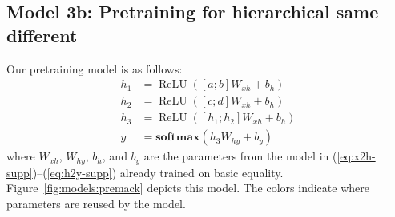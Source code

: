 \documentclass{article}
\newcommand{\Figref}[1]{Figure~\ref{#1}}
\newcommand{\eg}[1]{(\ref{#1})}
\newcommand{\dasheg}[2]{\eg{#1}--\eg{#2}}
\newcommand{\softmax}{\mathbf{softmax}}
\DeclareMathOperator{\ReLU}{ReLU}
\begin{document}
\subsection{Model 3b: Pretraining for hierarchical same--different}\label{sec:model3b}

Our pretraining model is as follows:
%
\begin{align}
  h_1 &= \ReLU([a;b]W_{xh} + b_{h}) \label{eq:preh1-supp}\\
  h_2 &= \ReLU([c;d]W_{xh} + b_{h})\\
  h_3 &= \ReLU([h_1;h_2]W_{xh} + b_{h}) \\
  y &= \softmax(h_3W_{hy} + b_{y}) \label{eq:prey-supp}\
\end{align}
%
where $W_{xh}$, $W_{hy}$, $b_h$, and $b_y$ are the parameters from the model in \dasheg{eq:x2h-supp}{eq:h2y-supp} already trained on basic equality. \Figref{fig:models:premack} depicts this model. The colors indicate where parameters are reused by the model.
\end{document}
